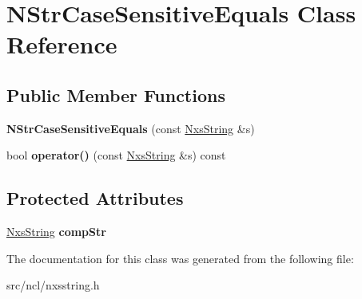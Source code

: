 \hypertarget{classNStrCaseSensitiveEquals}{
\section{NStrCaseSensitiveEquals Class Reference}
\label{classNStrCaseSensitiveEquals}
}
\subsection*{Public Member Functions}
\begin{DoxyCompactItemize}
\item 
\hypertarget{classNStrCaseSensitiveEquals_ad58017adf2d891883fb6276f4abc7314}{
{\bfseries NStrCaseSensitiveEquals} (const \hyperlink{classNxsString}{NxsString} \&s)}
\label{classNStrCaseSensitiveEquals_ad58017adf2d891883fb6276f4abc7314}

\item 
\hypertarget{classNStrCaseSensitiveEquals_a0917aae2b04a80ab0a6e5f780d4b3d79}{
bool {\bfseries operator()} (const \hyperlink{classNxsString}{NxsString} \&s) const }
\label{classNStrCaseSensitiveEquals_a0917aae2b04a80ab0a6e5f780d4b3d79}

\end{DoxyCompactItemize}
\subsection*{Protected Attributes}
\begin{DoxyCompactItemize}
\item 
\hypertarget{classNStrCaseSensitiveEquals_a3a3722574f9268f9c3009a53adb7123f}{
\hyperlink{classNxsString}{NxsString} {\bfseries compStr}}
\label{classNStrCaseSensitiveEquals_a3a3722574f9268f9c3009a53adb7123f}

\end{DoxyCompactItemize}


The documentation for this class was generated from the following file:\begin{DoxyCompactItemize}
\item 
src/ncl/nxsstring.h\end{DoxyCompactItemize}
